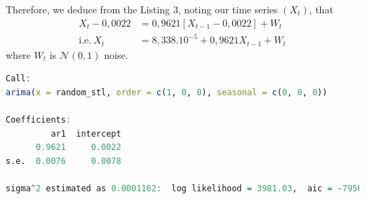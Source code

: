 Therefore, we deduce from the Listing 3, noting our time series $(X_t)$, that
\begin{align*}
X_t−0,0022 
 	&= 0,9621[X_{t-1}−0,0022] + W_t \\
\text{i.e.} \ X_t 
	&= 8,338.10^{-5} + 0,9621 X_{t-1} + W_t
\end{align*}
where $W_t$ is $\mathcal{N}(0,1)$ noise.
\begin{lstlisting}[language=R, caption=ARMA model]
Call:
arima(x = random_stl, order = c(1, 0, 0), seasonal = c(0, 0, 0))

Coefficients:
         ar1  intercept
      0.9621     0.0022
s.e.  0.0076     0.0078

sigma^2 estimated as 0.0001162:  log likelihood = 3981.03,  aic = -7956.06
\end{lstlisting}